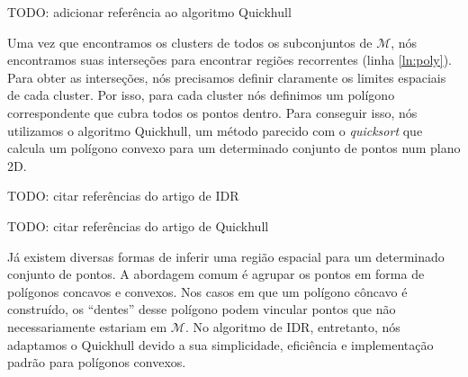 TODO: adicionar referência ao algoritmo Quickhull

Uma vez que encontramos os clusters de todos os subconjuntos de $\mathcal{M}$, nós encontramos suas interseções para encontrar regiões recorrentes (linha \ref{ln:poly}). Para obter as interseções, nós precisamos definir claramente os limites espaciais de cada cluster. Por isso, para cada cluster nós definimos um polígono correspondente que cubra todos os pontos dentro. Para conseguir isso, nós utilizamos o algoritmo Quickhull, um método parecido com o \textit{quicksort} que calcula um polígono convexo para um determinado conjunto de pontos num plano 2D.

TODO: citar referências do artigo de IDR

TODO: citar referências do artigo de Quickhull

Já existem diversas formas de inferir uma região espacial para um determinado conjunto de pontos. A abordagem comum é agrupar os pontos em forma de polígonos concavos e convexos. Nos casos em que um polígono côncavo é construído, os ``dentes'' desse polígono podem vincular pontos que não necessariamente estariam em $\mathcal{M}$. No algoritmo de IDR, entretanto, nós adaptamos o Quickhull devido a sua simplicidade, eficiência e implementação padrão para polígonos convexos.
